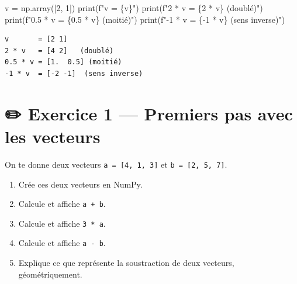 \documentclass[
  french,
  11pt,
  a4paper,
]{scrbook}
\newenvironment{Shaded}{}{}
\newcommand{\BuiltInTok}[1]{\textcolor[rgb]{0.84,0.23,0.29}{#1}}
\newcommand{\DecValTok}[1]{\textcolor[rgb]{0.00,0.36,0.77}{#1}}
\newcommand{\FloatTok}[1]{\textcolor[rgb]{0.00,0.36,0.77}{#1}}
\newcommand{\NormalTok}[1]{\textcolor[rgb]{0.14,0.16,0.18}{#1}}
\newcommand{\OperatorTok}[1]{\textcolor[rgb]{0.14,0.16,0.18}{#1}}
\newcommand{\SpecialCharTok}[1]{\textcolor[rgb]{0.00,0.36,0.77}{#1}}
\newcommand{\SpecialStringTok}[1]{\textcolor[rgb]{0.01,0.18,0.38}{#1}}
\providecommand{\tightlist}{%
  \setlength{\itemsep}{0pt}\setlength{\parskip}{0pt}}
\begin{document}
\begin{Shaded}
\begin{Highlighting}[]
\NormalTok{v }\OperatorTok{=}\NormalTok{ np.array([}\DecValTok{2}\NormalTok{, }\DecValTok{1}\NormalTok{])}
\BuiltInTok{print}\NormalTok{(}\SpecialStringTok{f"v       = }\SpecialCharTok{\{}\NormalTok{v}\SpecialCharTok{\}}\SpecialStringTok{"}\NormalTok{)}
\BuiltInTok{print}\NormalTok{(}\SpecialStringTok{f"2 * v   = }\SpecialCharTok{\{}\DecValTok{2} \OperatorTok{*}\NormalTok{ v}\SpecialCharTok{\}}\SpecialStringTok{   (doublé)"}\NormalTok{)}
\BuiltInTok{print}\NormalTok{(}\SpecialStringTok{f"0.5 * v = }\SpecialCharTok{\{}\FloatTok{0.5} \OperatorTok{*}\NormalTok{ v}\SpecialCharTok{\}}\SpecialStringTok{ (moitié)"}\NormalTok{)}
\BuiltInTok{print}\NormalTok{(}\SpecialStringTok{f"{-}1 * v  = }\SpecialCharTok{\{}\OperatorTok{{-}}\DecValTok{1} \OperatorTok{*}\NormalTok{ v}\SpecialCharTok{\}}\SpecialStringTok{  (sens inverse)"}\NormalTok{)}
\end{Highlighting}
\end{Shaded}

\begin{verbatim}
v       = [2 1]
2 * v   = [4 2]   (doublé)
0.5 * v = [1.  0.5] (moitié)
-1 * v  = [-2 -1]  (sens inverse)
\end{verbatim}

\section{✏️ Exercice 1 --- Premiers pas avec les
vecteurs}\label{exercice-1-premiers-pas-avec-les-vecteurs}

\begin{tcolorbox}[enhanced jigsaw, arc=.35mm, bottomrule=.15mm, bottomtitle=1mm, breakable, colback=white, colbacktitle=quarto-callout-note-color!10!white, colframe=quarto-callout-note-color-frame, coltitle=black, left=2mm, leftrule=.75mm, opacityback=0, opacitybacktitle=0.6, rightrule=.15mm, title={📝 Énoncé}, titlerule=0mm, toprule=.15mm, toptitle=1mm]

On te donne deux vecteurs \texttt{a\ =\ {[}4,\ 1,\ 3{]}} et
\texttt{b\ =\ {[}2,\ 5,\ 7{]}}.

\begin{enumerate}
\def\labelenumi{\arabic{enumi}.}
\tightlist
\item
  Crée ces deux vecteurs en NumPy.
\item
  Calcule et affiche \texttt{a\ +\ b}.
\item
  Calcule et affiche \texttt{3\ *\ a}.
\item
  Calcule et affiche \texttt{a\ -\ b}.
\item
  Explique ce que représente la soustraction de deux vecteurs,
  géométriquement.
\end{enumerate}

\end{tcolorbox}
\end{document}
